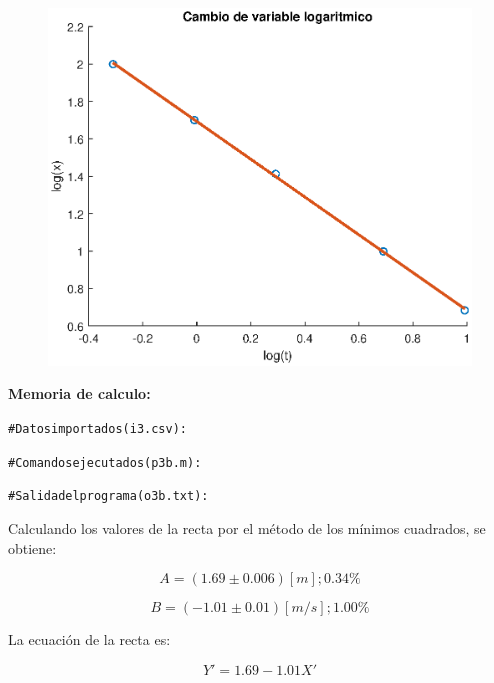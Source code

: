 \documentclass[letter,11pt]{article}
\begin{document}
\begin{enumerate}
    \begin{figure}[!h]
    \centering
    \includegraphics[scale=0.75]{resources/g3b.eps}
    \end{figure}

    \textbf{Memoria de calculo:}
    \begin{shaded}
        \begin{alltt}
            \footnotesize
\# Datos importados (i3.csv):


\# Comandos ejecutados (p3b.m):


\# Salida del programa (o3b.txt):

            \normalsize
        \end{alltt}
    \end{shaded}

    Calculando los valores de la recta por el método de los mínimos cuadrados,
    se obtiene:

    \begin{equation*}
        A = (1.69 \pm 0.006)[m];0.34\%
    \end{equation*}

    \begin{equation*}
        B = (-1.01 \pm 0.01)[m/s];1.00\%
    \end{equation*}

    La ecuación de la recta es:

    \begin{equation*}
        Y' = 1.69 - 1.01 X'
    \end{equation*}


\end{enumerate}
\end{document}
